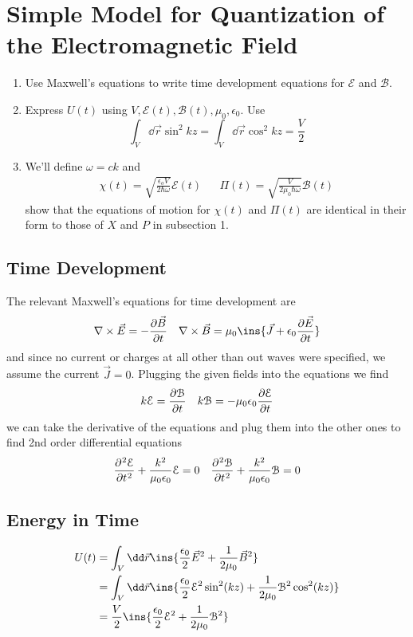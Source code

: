 \section{Simple Model for Quantization of the Electromagnetic Field}
\begin{colbox}
	\begin{enumerate}
		\item Use Maxwell's equations to write time development equations for $\mathcal{E}$ and $\mathcal{B}$.
		\item Express $U(t)$ using $V,\mathcal E(t), \mathcal B(t), \mu_0,\epsilon_0$. Use
		\begin{equation*}
			\int_V\dd \vec r \sin^2kz=\int_V\dd \vec r \cos^2kz=\frac{V}{2}
		\end{equation*}
		\item We'll define $\omega=ck$ and
		\begin{align*}
			\chi(t) = \sqrt{\frac{\epsilon_oV}{2\hbar\omega}}\mathcal E(t) && \Pi(t)=\sqrt{\frac{V}{2\mu_0\hbar\omega}}\mathcal B(t)
		\end{align*}
		show that the equations of motion for $\chi(t)$ and $\Pi(t)$ are identical in their form to those of $X$  and $P$ in subsection 1.
	\end{enumerate}
\end{colbox}
\subsection{Time Development}
The relevant Maxwell's equations for time development are
\begin{align}
	\nabla\times\vec E = -\diffp{\vec B}{t} && \nabla\times \vec B = \mu_0\ins{\vec J + \epsilon_0\diffp{\vec E}{t}}
\end{align}
and since no current or charges at all other than out waves were specified, we assume the current $\vec J=0$. Plugging the given fields into the equations we find
\begin{align}
	k\mathcal E = \diffp{\mathcal B}{t} && k\mathcal B = -\mu_0\epsilon_0\diffp{\mathcal E}{t}
\end{align}
we can take the derivative of the equations and plug them into the other ones to find 2nd order differential equations
\begin{align}
	\diffp[2]{\mathcal E}{t} + \frac{k^2}{\mu_0\epsilon_0}\mathcal E =0 && \diffp[2]{\mathcal B}{t} + \frac{k^2}{\mu_0\epsilon_0}\mathcal B =0
\end{align}
\newpage
\subsection{Energy in Time}
\begin{align}
	U(t) &= \int_V\dd \vec r\ins{\frac{\epsilon_0}{2}\vec E^2+\frac{1}{2\mu_0}\vec B^2}\\
	&= \int _V\dd \vec r\ins{\frac{\epsilon_0}{2}\mathcal E^2\sin^2(kz)+\frac{1}{2\mu_0}\mathcal B^2\cos^2(kz)}\\
	&= \frac{V}{2}\ins{\frac{\epsilon_0}{2}\mathcal E^2+\frac{1}{2\mu_0}\mathcal B^2}
\end{align}
